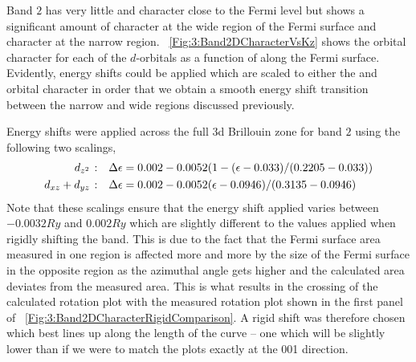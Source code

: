 Band $2$ has very little \Dxy and \DxTwoyTwo character close to the Fermi level but shows a significant amount of \DzTwo character at the wide region of the Fermi surface and \DxzDyz character at the narrow region. \Fig~\ref{Fig:3:Band2DCharacterVsKz} shows the orbital character for each of the $d$-orbitals as a function of \kz along the Fermi surface. Evidently, energy shifts could be applied which are scaled to either the \DzTwo and \DxzDyz orbital character in order that we obtain a smooth energy shift transition between the narrow and wide regions discussed previously.

Energy shifts were applied across the full $3$d Brillouin zone for band $2$ using the following two scalings,
\begin{align*}
\textrm{\DzTwo:}\quad \Delta\epsilon &= 0.002 - 0.0052 (1 - (\epsilon - 0.033)/(0.2205 - 0.033)) \\
\textrm{\DxzDyz:}\quad \Delta\epsilon &= 0.002 - 0.0052 (\epsilon - 0.0946)/(0.3135 - 0.0946)
\end{align*}
Note that these scalings ensure that the energy shift applied varies between $-0.0032\unit{Ry}$ and $0.002\unit{Ry}$ which are slightly different to the values applied when rigidly shifting the band. This is due to the fact that the Fermi surface area measured in one region is affected more and more by the size of the Fermi surface in the opposite region as the azimuthal angle gets higher and the calculated area deviates from the measured area. This is what results in the crossing of the calculated rotation plot with the measured rotation plot shown in the first panel of \fig~\ref{Fig:3:Band2DCharacterRigidComparison}. A rigid shift was therefore chosen which best lines up along the length of the curve -- one which will be slightly lower than if we were to match the plots exactly at the 001 direction.


